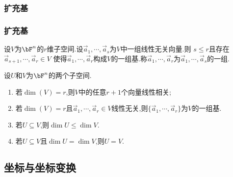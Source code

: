 \subsubsection{扩充基}
\begin{frame}\frametitle{扩充基}

\begin{theorem}[扩充基]
设$V$为$\bF^n$的$r$维子空间.\pp 设$\vec{a}_1,\cdots,\vec{a}_s$为$V$中一组线性无关向量.\pp 则
$s\leq r$且存在$\vec{a}_{s+1},\cdots,\vec{a}_r\in V$ 使得$\vec{a}_1,\cdots,\vec{a}_r$构成$V$的一组基.\pp 称$\vec{a}_1,\cdots,\vec{a}_r$为$\vec{a}_1,\cdots,\vec{a}_s$的一组.
\end{theorem}
\pp
\begin{proposition}
设$U$和$V$为$\bF^n$的两个子空间.\pp
\begin{enumerate}
\item 若$\dim(V)=r$,则$V$中的任意$r+1$个向量线性相关;\pp
\item 若$\dim(V)=r$且$\vec{a}_1,\cdots,\vec{a}_r\in V$线性无关,则$\{\vec{a}_1,\cdots,\vec{a}_r\}$为$V$的一组基.\pp
\item 若$U\subseteq V$,则$\dim U\leq \dim V$.\pp
\item 若$U\subseteq V$且$\dim U=\dim V$,则$U=V$.
\end{enumerate}
\end{proposition}
\end{frame}


\subsection{坐标与坐标变换}

